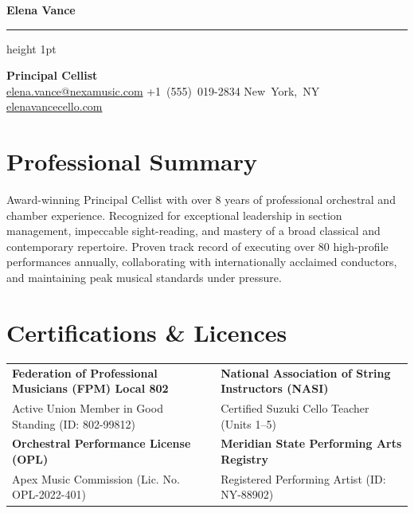 \documentclass[10pt,letterpaper]{article}
\newcommand{\contactitem}[2]{\mbox{\color{secondary}#1\hspace{0.4em}#2}}
\begin{document}
\color{primary}

\begin{center}
    {\Huge\bfseries\color{accent} Elena Vance} \\
    \vspace{0.2em}
    {\color{linegray}\hrule height 1pt}
    \vspace{0.3em}
    {\large\bfseries Principal Cellist} \\
    \vspace{0.3em}
    \small
    \contactitem{\faEnvelope}{\href{mailto:elena.vance@nexamusic.com}{elena.vance@nexamusic.com}} \quad\textbullet\quad
    \contactitem{\faPhone}{+1 (555) 019-2834} \quad\textbullet\quad
    \contactitem{\faMapMarker}{New York, NY} \quad\textbullet\quad
    \contactitem{\faGlobe}{\href{https://elenavancecello.com}{elenavancecello.com}}
\end{center}

\vspace{0.4em}

\section*{Professional Summary}
Award-winning Principal Cellist with over 8 years of professional orchestral and chamber experience. Recognized for exceptional leadership in section management, impeccable sight-reading, and mastery of a broad classical and contemporary repertoire. Proven track record of executing over 80 high-profile performances annually, collaborating with internationally acclaimed conductors, and maintaining peak musical standards under pressure.

\section*{Certifications \& Licences}
\begin{tabularx}{\textwidth}{@{}X X@{}}
    \textbf{Federation of Professional Musicians (FPM) Local 802} & \textbf{National Association of String Instructors (NASI)} \\
    Active Union Member in Good Standing (ID: 802-99812) & Certified Suzuki Cello Teacher (Units 1--5) \\
    \textbf{Orchestral Performance License (OPL)} & \textbf{Meridian State Performing Arts Registry} \\
    Apex Music Commission (Lic. No. OPL-2022-401) & Registered Performing Artist (ID: NY-88902) \\
\end{tabularx}
\end{document}
